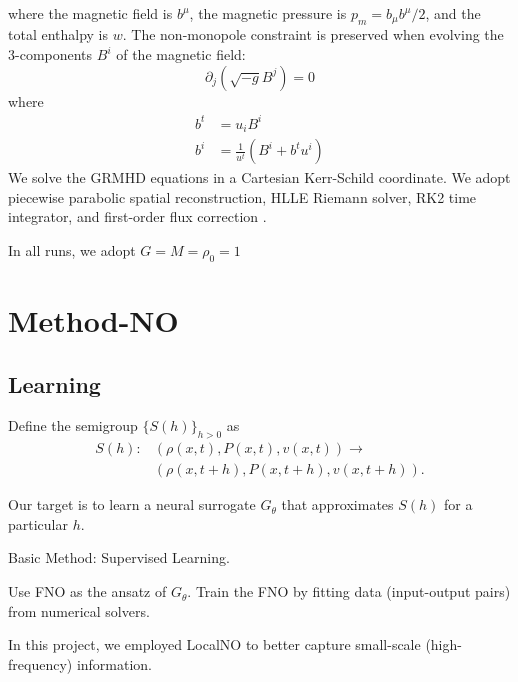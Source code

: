 \documentclass[%
 reprint,
 superscriptaddress,
 amsmath,amssymb,
 nofootinbib,
 prd,
]{revtex4-2}
\begin{document}
where the magnetic field is $b^\mu$, the magnetic pressure is $p_m= b_\mu b^\mu/2$, and the total enthalpy is $w$. 
The non-monopole constraint is preserved when evolving the 3-components $B^i$ of the magnetic field: 
\begin{equation}
    \partial_j (\sqrt{-g} B^j)=0
\end{equation}
where 
\begin{align}
    b^t &= u_i B^i \\
    b^i &= \frac{1}{u^t}(B^i+b^tu^i)
\end{align}
We solve the GRMHD equations in a Cartesian Kerr-Schild coordinate. 
We adopt piecewise parabolic spatial reconstruction, HLLE Riemann solver, RK2 time integrator, and first-order flux correction \cite{2009ApJ...691.1092L}.

In all runs, we adopt $G=M=\rho_0=1$


\section{Method-NO}
\label{sec:method-no}




\subsection{Learning}
Define the semigroup $\{S(h)\}_{h>0}$  as 
\begin{align}
    S(h): &(\rho(x,t),P(x,t),v(x,t))\to \nonumber \\
    &(\rho(x,t+h),P(x,t+h),v(x,t+h)).
\end{align}

Our target is to learn a neural surrogate $G_\theta$ that approximates $S(h)$ for a particular $h$. 

Basic Method: Supervised Learning.

Use FNO as the ansatz of $G_\theta$. Train the FNO by fitting data (input-output pairs) from numerical solvers.

In this project, we employed LocalNO to better capture small-scale (high-frequency) information.
\end{document}
